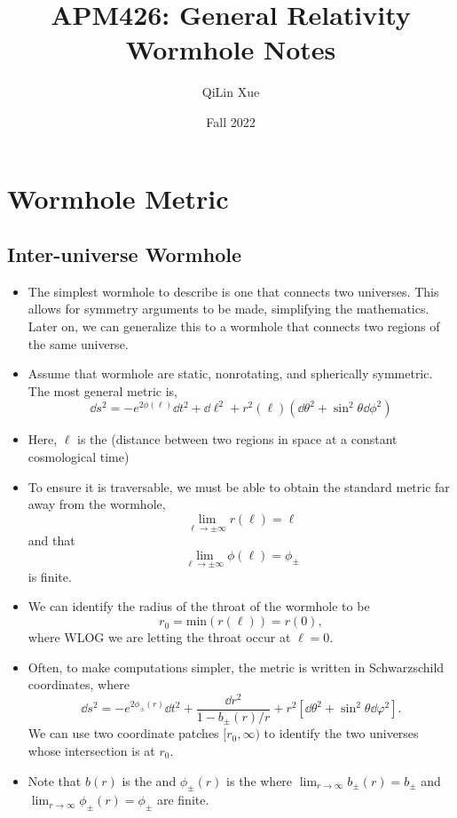 \documentclass{article}
\title{APM426: General Relativity \\ Wormhole Notes}
\author{QiLin Xue}
\date{Fall 2022}
\numberwithin{equation}{section}
\begin{document}
\maketitle
\tableofcontents
\newpage
\section{Wormhole Metric}
\subsection{Inter-universe Wormhole}
\begin{itemize}
    \item The simplest wormhole to describe is one that connects two universes. This allows for symmetry arguments to be made, simplifying the mathematics. Later on, we can generalize this to a wormhole that connects two regions of the same universe.
    \item Assume that wormhole are static, nonrotating, and spherically symmetric. The most general metric is,
    \begin{equation}
        \dd{s}^2 = -e^{2\phi(\ell)}\dd{t}^2 + \dd{\ell}^2 + r^2(\ell)\left(\dd{\theta}^2 + \sin^2\theta \dd{\phi}^2\right) 
    \end{equation}
    \item Here, $\ell$ is the  (distance between two regions in space at a constant cosmological time)
    \item To ensure it is traversable, we must be able to obtain the standard metric far away from the wormhole,
    \begin{equation}
        \lim_{\ell \to \pm \infty} r(\ell) = \ell
    \end{equation}
    and that 
    \begin{equation}
        \lim_{\ell \to \pm \infty} \phi(\ell) = \phi_{\pm}
    \end{equation}
    is finite.
    \item We can identify the radius of the throat of the wormhole to be 
    \begin{equation}
        r_0 = \text{min}(r(\ell)) = r(0),
    \end{equation}
    where WLOG we are letting the throat occur at $\ell = 0.$
    \item Often, to make computations simpler, the metric is written in Schwarzschild coordinates, where 
    \begin{equation}
        \dd{s}^2 = -e^{2\phi_{\pm}(r)} \dd{t}^2 + \frac{\dd{r}^2}{1 - b_\pm (r)/r} + r^2\left[\dd{\theta}^2 + \sin^2\theta \dd{\varphi}^2\right].
    \end{equation}
    We can use two coordinate patches $[r_0, \infty)$ to identify the two universes whose intersection is at $r_0.$
    \item Note that $b(r)$ is the  and $\phi_{\pm}(r)$ is the  where $\lim_{r \to \infty} b_{\pm}(r) = b_{\pm}$ and $\lim_{r\to\infty} \phi_{\pm}(r) = \phi_{\pm}$ are finite.
    

\end{itemize}
\end{document}
